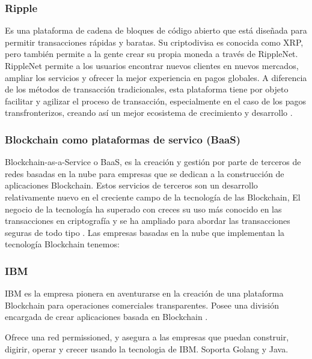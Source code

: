 \subsubsection*{Ripple}

Es una plataforma de cadena de bloques de código abierto que está diseñada para permitir transacciones rápidas y 
baratas. Su criptodivisa es conocida como XRP, pero también permite a la gente crear su propia moneda a través de 
RippleNet. RippleNet permite a los usuarios encontrar nuevos clientes en nuevos mercados, ampliar los servicios y 
ofrecer la mejor experiencia en pagos globales. A diferencia de los métodos de transacción tradicionales, esta 
plataforma tiene por objeto facilitar y agilizar el proceso de transacción, especialmente en el caso de los pagos 
transfronterizos, creando así un mejor ecosistema de crecimiento y desarrollo \cite{top-blockchain-platforms-app}.

\subsubsection{Blockchain como plataformas de servico (BaaS)}

Blockchain-as-a-Service o BaaS, es la creación y gestión por parte de terceros de redes basadas en la nube para 
empresas que se dedican a la construcción de aplicaciones Blockchain. Estos servicios de terceros son un desarrollo 
relativamente nuevo en el creciente campo de la tecnología de las Blockchain, El negocio de la tecnología ha superado 
con creces su uso más conocido en las transacciones en criptografía y se ha ampliado para abordar las transacciones 
seguras de todo tipo \cite{blockchain-as-a-service, top-blockchain-platforms}. Las empresas basadas en la nube que 
implementan la tecnología Blockchain tenemos:

\subsubsection*{IBM}

IBM es la empresa pionera en aventurarse en la creación de una plataforma Blockchain para operaciones comerciales
transparentes. Posee una división encargada de crear aplicaciones basada en Blockchain \cite{top-blockchain-platforms}.

\vspace{5mm}

\noindent Ofrece una red permissioned, y asegura a las empresas que puedan construir, digirir, operar y crecer usando
la tecnologia de IBM. Soporta Golang y Java.

